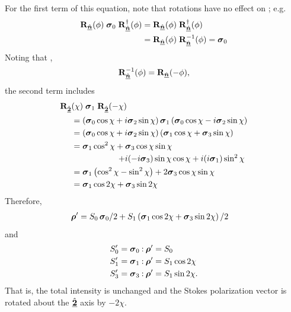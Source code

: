 \noindent
For the first term of this equation, note that rotations have no effect on ; e.g.
\begin{equation} \begin{split}
{\bf R}_{\hat{\underline{\mbox{\scriptsize\boldmath $n$}}}}(\phi) \; \mbox{\boldmath $\sigma$}_{0} \;{\bf R}_{\hat{\underline{\mbox{\scriptsize\boldmath $n$}}}}^\dagger(\phi) 
& = {\bf R}_{\hat{\underline{\mbox{\scriptsize\boldmath $n$}}}}(\phi) \;{\bf R}_{\hat{\underline{\mbox{\scriptsize\boldmath $n$}}}}^\dagger(\phi) \\
& = {\bf R}_{\hat{\underline{\mbox{\scriptsize\boldmath $n$}}}}(\phi) \;{\bf R}_{\hat{\underline{\mbox{\scriptsize\boldmath $n$}}}}^{-1}(\phi) = \mbox{\boldmath $\sigma$}_{0}
\end{split} \end{equation}
%
Noting that ,
\begin{equation}
{\bf R}_{\hat{\underline{\mbox{\scriptsize\boldmath $n$}}}}^{-1}(\phi) = {\bf R}_{\hat{\underline{\mbox{\scriptsize\boldmath $n$}}}}(-\phi),
\end{equation}
%
the second term includes
%
%
\begin{equation}
\begin{split}
\vRotation[2]&(\chi) \; \pauli{1} \; \vRotation[2](-\chi) \\
&= \left( \pauli{0}\cos\chi + \Ci\pauli{2}\sin\chi \right) \pauli{1} \left( \pauli{0}\cos\chi - \Ci\pauli{2}\sin\chi \right) \\
&= \left( \pauli{0}\cos\chi + \Ci\pauli{2}\sin\chi \right) \left( \pauli{1}\cos\chi + \pauli{3}\sin\chi \right) \\
&= \pauli{1}\cos^2\chi + \pauli{3}\cos\chi\sin\chi \\
& \omit\hfill\ensuremath{+ \Ci(-\Ci \pauli{3})\sin\chi\cos\chi + \Ci(\Ci \pauli{1})\sin^2\chi} \\
&= \pauli{1} \left(\cos^2\chi - \sin^2\chi\right) + 2 \pauli{3} \cos\chi\sin\chi \\ 
&= \pauli{1} \cos2\chi  + \pauli{3} \sin2\chi \label{eqn:rotate_q_about_u}
\end{split}
\end{equation}
%
Therefore,
%
\begin{equation} \begin{split}
\mbox{\boldmath $\rho$}' &= S_0 \, \mbox{\boldmath $\sigma$}_{0}/2 + S_1 \left( \mbox{\boldmath $\sigma$}_{1} \cos2\chi  + \mbox{\boldmath $\sigma$}_{3} \sin2\chi \right)/2
\end{split} \end{equation}
and
\begin{equation} \begin{split}
S_0' &= \mbox{\boldmath $\sigma$}_{0} \mathbin{:} \mbox{\boldmath $\rho$}' = S_0 \\
S_1' &= \mbox{\boldmath $\sigma$}_{1} \mathbin{:} \mbox{\boldmath $\rho$}' = S_1 \cos2\chi \\
S_3' &= \mbox{\boldmath $\sigma$}_{3} \mathbin{:} \mbox{\boldmath $\rho$}' = S_1 \sin2\chi. \label{eqn:Stokes_rotation}
\end{split} \end{equation}
That is, the total intensity is unchanged and the Stokes polarization vector is rotated about the $\hat{\underline{\mbox{\boldmath $2$}}}$
axis by $-2\chi$.


